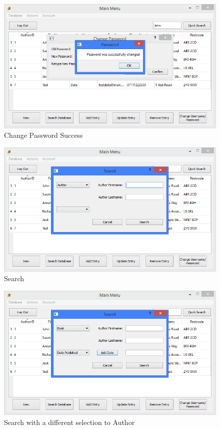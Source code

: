 \begin{figure}[H]
    \caption{Change Password Success} \label{fig:ChangePasswordSuccess}
    \includegraphics[width=\textwidth]{./Maintenance/UserInterface/ChangePasswordSuccess.png}
\end{figure}

\begin{figure}[H]
    \caption{Search} \label{fig:Search}
    \includegraphics[width=\textwidth]{./Maintenance/UserInterface/Search.png}
\end{figure}

\begin{figure}[H]
    \caption{Search with a different selection to Author} \label{fig:SearchSelectionChosen}
    \includegraphics[width=\textwidth]{./Maintenance/UserInterface/SearchSelectionChosen.png}
\end{figure}

